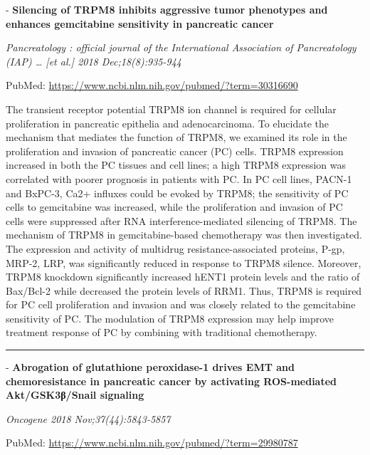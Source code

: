 \documentclass[]{article}
\begin{document}
 - \textbf{Silencing of TRPM8 inhibits aggressive tumor phenotypes and
enhances gemcitabine sensitivity in pancreatic cancer}

\emph{Pancreatology : official journal of the International Association
of Pancreatology (IAP) \ldots{} {[}et al.{]} 2018 Dec;18(8):935-944}

PubMed: \url{https://www.ncbi.nlm.nih.gov/pubmed/?term=30316690}

The transient receptor potential TRPM8 ion channel is required for
cellular proliferation in pancreatic epithelia and adenocarcinoma. To
elucidate the mechanism that mediates the function of TRPM8, we examined
its role in the proliferation and invasion of pancreatic cancer (PC)
cells. TRPM8 expression increased in both the PC tissues and cell lines;
a high TRPM8 expression was correlated with poorer prognosis in patients
with PC. In PC cell lines, PACN-1 and BxPC-3, Ca2+ influxes could be
evoked by TRPM8; the sensitivity of PC cells to gemcitabine was
increased, while the proliferation and invasion of PC cells were
suppressed after RNA interference-mediated silencing of TRPM8. The
mechanism of TRPM8 in gemcitabine-based chemotherapy was then
investigated. The expression and activity of multidrug
resistance-associated proteins, P-gp, MRP-2, LRP, was significantly
reduced in response to TRPM8 silence. Moreover, TRPM8 knockdown
significantly increased hENT1 protein levels and the ratio of Bax/Bcl-2
while decreased the protein levels of RRM1. Thus, TRPM8 is required for
PC cell proliferation and invasion and was closely related to the
gemcitabine sensitivity of PC. The modulation of TRPM8 expression may
help improve treatment response of PC by combining with traditional
chemotherapy.

{}

{}

\begin{center}\rule{0.5\linewidth}{\linethickness}\end{center}

 - \textbf{Abrogation of glutathione peroxidase-1 drives EMT and
chemoresistance in pancreatic cancer by activating ROS-mediated
Akt/GSK3β/Snail signaling}

\emph{Oncogene 2018 Nov;37(44):5843-5857}

PubMed: \url{https://www.ncbi.nlm.nih.gov/pubmed/?term=29980787}
\end{document}
